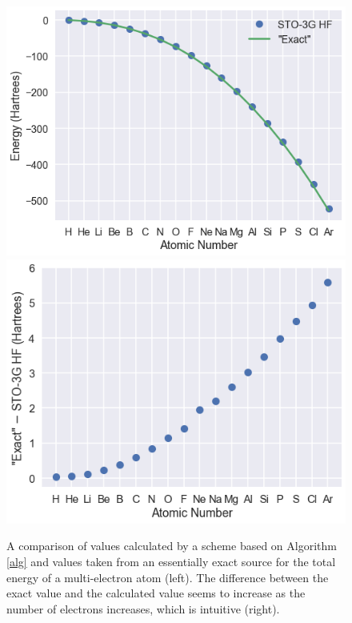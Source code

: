 \documentclass[12pt]{article}
\begin{document}
\begin{figure}[h]
\begin{center}
\includegraphics[scale=0.4]{img/atom-energy1}
\includegraphics[scale=0.4]{img/atom-energy2}
\end{center}
\caption{A comparison of values calculated by a scheme based on Algorithm \ref{alg} and values taken from an essentially exact source \cite{bunge1993roothaan} for the total energy of a multi-electron atom (left).  The difference between the exact value and the calculated value seems to increase as the number of electrons increases, which is intuitive (right).} \label{atom-energy}
\end{figure} 
\end{document}
